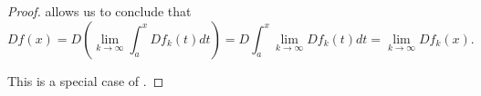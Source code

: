 \begin{proof}
   allows us to conclude that
  \begin{equation*}
    D f(x)
    =
    D\left(\lim_{k \to \infty} \int_a^x D f_k(t) dt \right)
    =
    D \int_a^x \lim_{k \to \infty} D f_k(t) dt
    =
    \lim_{k \to \infty} D f_k(x).
  \end{equation*}

   This is a special case of .
\end{proof}
